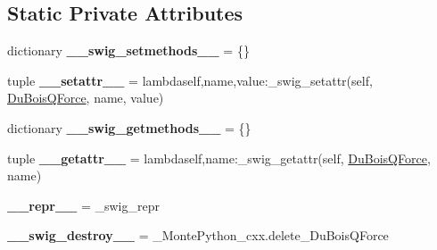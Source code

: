\subsection*{Static Private Attributes}
\begin{DoxyCompactItemize}
\item 
\hypertarget{classMontePython__cxx_1_1DuBoisQForce_a4722237d210ece6a5609f2f1e2cd412c}{}dictionary {\bfseries \+\_\+\+\_\+swig\+\_\+setmethods\+\_\+\+\_\+} = \{\}\label{classMontePython__cxx_1_1DuBoisQForce_a4722237d210ece6a5609f2f1e2cd412c}

\item 
\hypertarget{classMontePython__cxx_1_1DuBoisQForce_a1bbca8bf0dc1faa110b1c94d6689fda0}{}tuple {\bfseries \+\_\+\+\_\+setattr\+\_\+\+\_\+} = lambdaself,name,value\+:\+\_\+swig\+\_\+setattr(self, \hyperlink{classMontePython__cxx_1_1DuBoisQForce}{Du\+Bois\+Q\+Force}, name, value)\label{classMontePython__cxx_1_1DuBoisQForce_a1bbca8bf0dc1faa110b1c94d6689fda0}

\item 
\hypertarget{classMontePython__cxx_1_1DuBoisQForce_a4729c24f8df144e0ec808588a71cf7de}{}dictionary {\bfseries \+\_\+\+\_\+swig\+\_\+getmethods\+\_\+\+\_\+} = \{\}\label{classMontePython__cxx_1_1DuBoisQForce_a4729c24f8df144e0ec808588a71cf7de}

\item 
\hypertarget{classMontePython__cxx_1_1DuBoisQForce_aee6b184b8cd1bc24c3c1fe65b5495685}{}tuple {\bfseries \+\_\+\+\_\+getattr\+\_\+\+\_\+} = lambdaself,name\+:\+\_\+swig\+\_\+getattr(self, \hyperlink{classMontePython__cxx_1_1DuBoisQForce}{Du\+Bois\+Q\+Force}, name)\label{classMontePython__cxx_1_1DuBoisQForce_aee6b184b8cd1bc24c3c1fe65b5495685}

\item 
\hypertarget{classMontePython__cxx_1_1DuBoisQForce_a3ecf8259c4038f63dcf6d7e8826c50ef}{}{\bfseries \+\_\+\+\_\+repr\+\_\+\+\_\+} = \+\_\+swig\+\_\+repr\label{classMontePython__cxx_1_1DuBoisQForce_a3ecf8259c4038f63dcf6d7e8826c50ef}

\item 
\hypertarget{classMontePython__cxx_1_1DuBoisQForce_a712d3a0166664e6320e4e779ee23da53}{}{\bfseries \+\_\+\+\_\+swig\+\_\+destroy\+\_\+\+\_\+} = \+\_\+\+Monte\+Python\+\_\+cxx.\+delete\+\_\+\+Du\+Bois\+Q\+Force\label{classMontePython__cxx_1_1DuBoisQForce_a712d3a0166664e6320e4e779ee23da53}

\end{DoxyCompactItemize}


